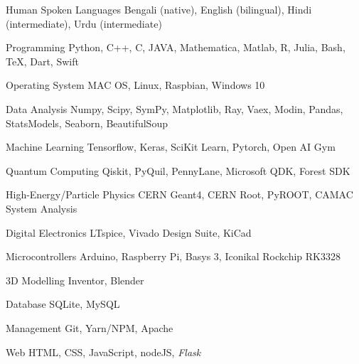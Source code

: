 
\begin{cvskills}

    \cvskill
    {Human Spoken Languages}
    {Bengali (native), English (bilingual), Hindi (intermediate), Urdu (intermediate)}

    \cvskill
    {Programming}
    {Python, C++, C, JAVA, Mathematica, Matlab, R, Julia, Bash, \TeX, Dart, Swift}

    \cvskill
    {Operating System}
    {MAC OS, Linux, Raspbian, Windows 10}

    \cvskill
    {Data Analysis}
    {Numpy, Scipy, SymPy, Matplotlib, Ray, Vaex, Modin, Pandas, StatsModels, Seaborn, BeautifulSoup}


    \cvskill
    {Machine Learning}
    {Tensorflow, Keras, SciKit Learn, Pytorch, Open AI Gym}


    \cvskill
    {Quantum Computing}
    {Qiskit, PyQuil, PennyLane, Microsoft QDK, Forest SDK}

    \cvskill
    {High-Energy/Particle Physics}
    {CERN Geant4, CERN Root, PyROOT, CAMAC System Analysis}

    \cvskill
    {Digital Electronics}
    {LTspice, Vivado Design Suite, KiCad}

    \cvskill
    {Microcontrollers}
    {Arduino, Raspberry Pi, Basys 3, Iconikal Rockchip RK3328}

    \cvskill
    {3D Modelling}
    {Inventor, Blender}

    \cvskill
    {Database}
    {SQLite, MySQL}

    \cvskill
    {Management}
    {Git, Yarn/NPM, Apache}

    \cvskill
    {Web}
    {HTML, CSS, JavaScript, nodeJS, \textit{Flask}}

\end{cvskills}
